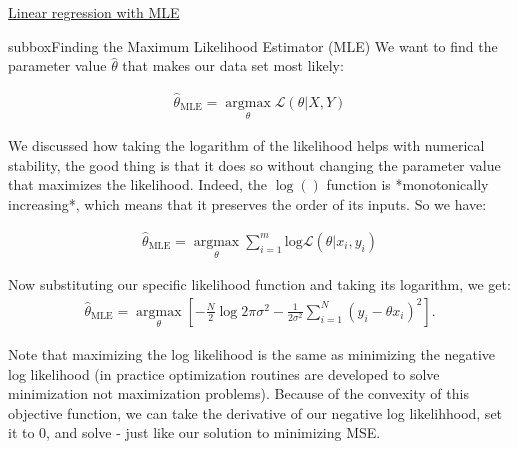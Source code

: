 \begin{textbox}{\href{https://compneuro.neuromatch.io/tutorials/W1D2_ModelFitting/student/W1D2_Tutorial2.html}{Linear regression with MLE }   }
\begin{subbox}{subbox}{Finding the Maximum Likelihood Estimator (MLE)}
\scriptsize
We want to find the parameter value $\hat\theta$ that makes our data set most likely:

\begin{align}
\hat{\theta}_{\textrm{MLE}} = \underset{\theta}{\operatorname{argmax}} \mathcal{L}(\theta|X,Y) 
\end{align}

We discussed how taking the logarithm of the likelihood helps with numerical stability, the good thing is that it does so without changing the parameter value that maximizes the likelihood. Indeed, the $\log()$ function is *monotonically increasing*, which means that it preserves the order of its inputs. So we have:

\begin{align}
\hat{\theta}_{\textrm{MLE}} = \underset{\theta}{\operatorname{argmax}} \sum_{i=1}^m \textrm{log} \mathcal{L}(\theta|x_i,y_i) 
\end{align}

Now substituting our specific likelihood function and taking its logarithm, we get:
\begin{align}
\hat{\theta}_{\textrm{MLE}} = \underset{\theta}{\operatorname{argmax}} [-\frac{N}{2} \operatorname{log} 2\pi\sigma^2 - \frac{1}{2\sigma^2}\sum_{i=1}^N (y_i-\theta x_i)^2].
\end{align}

Note that maximizing the log likelihood is the same as minimizing the negative log likelihood (in practice optimization routines are developed to solve minimization not maximization problems). Because of the convexity of this objective function, we can take the derivative of our negative log likelihhood, set it to 0, and solve - just like our solution to minimizing MSE.


\end{subbox}
\end{textbox}
